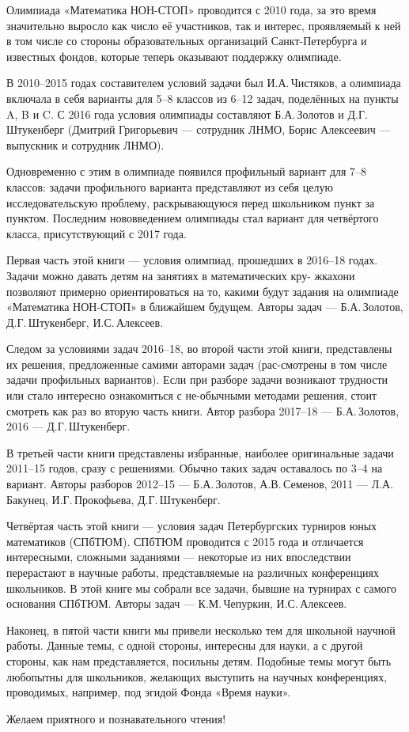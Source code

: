 \noindent\abz Олимпиада «Математика НОН-СТОП» проводится с 2010 года, за это время значительно выросло как число её участников, так и интерес, проявляемый к ней в том числе со стороны образовательных организаций Санкт-Петербурга и известных фондов, которые теперь оказывают поддержку олимпиаде.

\aabz В 2010–2015 годах составителем условий задачи был И.А.\,Чистяков, а олимпиада включала в себя варианты для 5–8 классов из 6–12 задач, поделённых на пункты A, B и C. С 2016 года условия олимпиады составляют Б.А.\,Золотов и Д.Г.\,Штукенберг (Дмитрий Григорьевич — сотрудник ЛНМО, Борис Алексеевич — выпускник и сотрудник ЛНМО).

\aabz Одновременно с этим в олимпиаде появился профильный вариант для 7–8 классов: задачи профильного варианта представляют из себя целую исследовательскую проблему, раскрывающуюся перед школьником пункт за пунктом. Последним нововведением олимпиады стал вариант для четвёртого класса, присутствующий с 2017 года.

\aabz Первая часть этой книги — условия олимпиад, прошедших в 2016–18 годах. Задачи можно давать детям на занятиях в математических кру- жках\scolon они позволяют примерно ориентироваться на то, какими будут задания на олимпиаде «Математика НОН-СТОП» в ближайшем будущем. Авторы задач — Б.А.\,Золотов, Д.Г.\,Штукенберг, И.С.\,Алексеев.

\aabz Следом за условиями задач 2016–18, во второй части этой книги, представлены их решения, предложенные самими авторами задач (рас-\linebreak смотрены в том числе задачи профильных вариантов). Если при разборе задачи возникают трудности или стало интересно ознакомиться с не-\linebreak обычными методами решения, стоит смотреть как раз во вторую часть книги. Автор разбора 2017–18 — Б.А.\,Золотов, 2016 — Д.Г.\,Штукенберг.

\aabz В третьей части книги представлены избранные, наиболее оригинальные задачи 2011–15 годов, сразу с решениями. Обычно таких задач оставалось по 3–4 на вариант. Авторы разборов 2012–15 — Б.А.\,Золотов, А.В.\,Семенов, 2011 — Л.А.\,Бакунец, И.Г.\,Прокофьева, Д.Г.\,Штукенберг.

\aabz Четвёртая часть этой книги — условия задач Петербургских турниров юных математиков (СПбТЮМ). СПбТЮМ проводится с 2015 года и отличается интересными, сложными заданиями — некоторые из них впоследствии перерастают в научные работы, представляемые на различных конференциях школьников. В этой книге мы собрали все задачи, бывшие на турнирах с самого основания СПбТЮМ. Авторы задач — К.М.\,Чепуркин, И.С.\,Алексеев.

\thispagestyle{empty}

\aabz Наконец, в пятой части книги мы привели несколько тем для школьной научной работы. Данные темы, с одной стороны, интересны для науки, а с другой стороны, как нам представляется, посильны детям. Подобные темы могут быть любопытны для школьников, желающих выступить на научных конференциях, проводимых, например, под эгидой Фонда «Время науки».

\aabz Желаем приятного и познавательного чтения!

